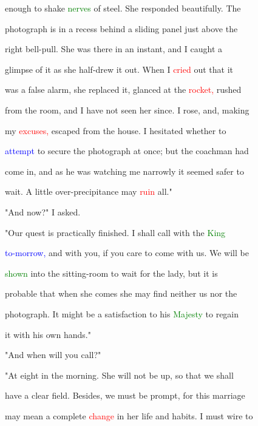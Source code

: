  enough to shake \textcolor{green}{nerves} of steel. She responded beautifully. The

 photograph is in a recess behind a sliding panel just above the

 right bell-pull. She was there in an instant, and I caught a

 glimpse of it as she half-drew it out. When I \textcolor{red}{cried} out that it

 was a false \textcolor{BurntOrange}{alarm,} she replaced it, glanced at the \textcolor{red}{rocket,} rushed

 from the room, and I have not seen her since. I rose, and, making

 my \textcolor{red}{excuses,} \textcolor{BurntOrange}{escaped} from the house. I hesitated whether to

 \textcolor{blue}{attempt} to secure the photograph at once; but the coachman had

 come in, and as he was \textcolor{BurntOrange}{watching} me narrowly it seemed safer to

 \textcolor{BurntOrange}{wait.} A little over-precipitance may \textcolor{red}{ruin} all."



 "And now?" I asked.



 "Our \textcolor{BurntOrange}{quest} is practically finished. I shall call with the \textcolor{green}{King}

 \textcolor{blue}{to-morrow,} and with you, if you care to come with us. We will be

 \textcolor{green}{shown} into the sitting-room to \textcolor{BurntOrange}{wait} for the lady, but it is

 probable that when she comes she may find neither us nor the

 photograph. It might be a satisfaction to his \textcolor{green}{Majesty} to regain

 it with his own hands."



 "And when will you call?"



 "At eight in the morning. She will not be up, so that we shall

 have a clear field. Besides, we must be prompt, for this \textcolor{BurntOrange}{marriage}

 may mean a complete \textcolor{red}{change} in her life and habits. I must wire to

